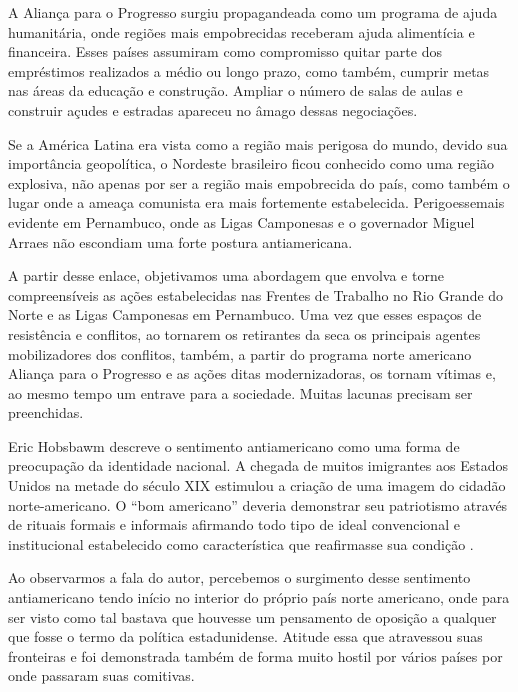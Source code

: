 \begin{refsection}
    A Aliança para o Progresso surgiu propagandeada como um programa de ajuda humanitária, onde regiões mais empobrecidas receberam ajuda alimentícia e financeira. Esses países assumiram como compromisso quitar parte dos empréstimos realizados a médio ou longo prazo, como também, cumprir metas nas áreas da educação e construção. Ampliar o número de salas de aulas e construir açudes e estradas apareceu no âmago dessas negociações. 

    Se a América Latina era vista como a região mais perigosa do mundo, devido sua importância geopolítica, o Nordeste brasileiro ficou conhecido como uma região explosiva, não apenas por ser a região mais empobrecida do país, como também o lugar onde a ameaça comunista era mais fortemente estabelecida. Perigoessemais evidente em Pernambuco, onde as Ligas Camponesas e o governador Miguel Arraes não escondiam uma forte postura antiamericana. 

    A partir desse enlace, objetivamos uma abordagem que envolva e torne compreensíveis as ações estabelecidas nas Frentes de Trabalho no Rio Grande do Norte e as Ligas Camponesas em Pernambuco. Uma vez que esses espaços de resistência e conflitos, ao tornarem os retirantes da seca os principais agentes mobilizadores dos conflitos, também, a partir do programa norte americano Aliança para o Progresso e as ações ditas modernizadoras, os tornam vítimas e, ao mesmo tempo um entrave para a sociedade. Muitas lacunas precisam ser preenchidas. 

    Eric Hobsbawm descreve o sentimento antiamericano como uma forma de preocupação da identidade nacional. A chegada de muitos imigrantes aos Estados Unidos na metade do século XIX estimulou a criação de uma imagem do cidadão norte-americano. O ``bom americano'' deveria demonstrar seu patriotismo através de rituais formais e informais afirmando todo tipo de ideal convencional e institucional estabelecido como característica que reafirmasse sua condição \cite[p.~288]{Hobsbawm1984Producao}.

    Ao observarmos a fala do autor, percebemos o surgimento desse sentimento antiamericano tendo início no interior do próprio país norte americano, onde para ser visto como tal bastava que houvesse um pensamento de oposição a qualquer que fosse o termo da política estadunidense. Atitude essa que atravessou suas fronteiras e foi demonstrada também de forma muito hostil por vários países por onde passaram suas comitivas. 


\end{refsection}
